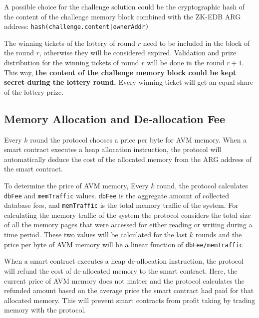 A possible choice for the challenge solution could be the cryptographic hash of the content of the challenge
memory block combined with the ZK-EDB ARG address: \texttt{hash(challenge.content|ownerAddr)}

The winning tickets of the lottery of round $r$ need to be included in the block of the round $r$,
otherwise they will be considered expired. Validation and prize distribution for the winning tickets of round
$r$ will be done in the round $r + 1$. This way, \textbf{the content of the challenge memory block could be
kept secret during the lottery round.} Every winning ticket will get an equal share of the lottery prize.

\subsection{Memory Allocation and De-allocation Fee}\label{subsec:memory-allocation-and-de-allocation}

Every $k$ round the protocol chooses a price per byte for AVM memory. When a smart contract executes a heap
allocation instruction, the protocol will automatically deduce the cost of the allocated memory from the ARG
address of the smart contract.

To determine the price of AVM memory, Every $k$ round, the protocol calculates \texttt{dbFee} and
\texttt{memTraffic} values. \texttt{dbFee} is the aggregate amount of collected database fees, and
\texttt{memTraffic} is the total memory traffic of the system. For calculating the memory traffic of the system
the protocol considers the total size of all the memory pages that were accessed for either reading or writing
during a time period. These two values will be calculated for the last $k$ rounds and the price per byte of
AVM memory will be a linear function of \texttt{dbFee/memTraffic}

When a smart contract executes a heap de-allocation instruction, the protocol will refund the cost of
de-allocated memory to the smart contract. Here, the current price of AVM memory does not matter and the protocol
calculates the refunded amount based on the average price the smart contract had paid for that allocated memory.
This will prevent smart contracts from profit taking by trading memory with the protocol.